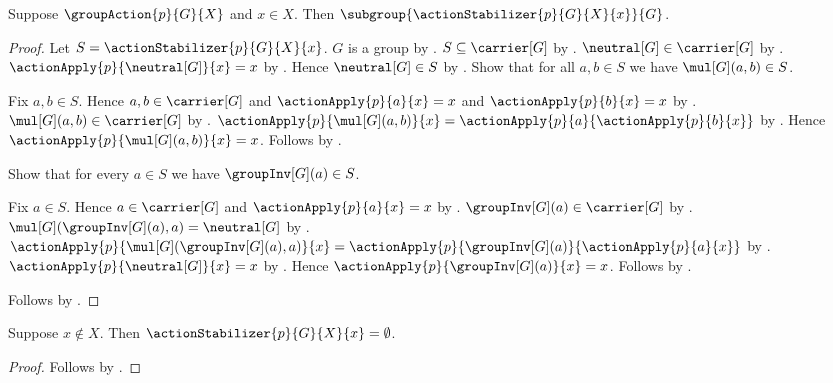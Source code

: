 \begin{theorem}\label{action_stabilizer_subgroup}
    Suppose $\groupAction{p}{G}{X}$ and $x\in X$.
    Then $\subgroup{\actionStabilizer{p}{G}{X}{x}}{G}$.
\end{theorem}
\begin{proof}
    Let $S=\actionStabilizer{p}{G}{X}{x}$.
    $G$ is a group by .
    $S\subseteq\carrier[G]$ by
        .
    $\neutral[G]\in\carrier[G]$ by
        .
    $\actionApply{p}{\neutral[G]}{x}=x$ by
        .
    Hence $\neutral[G]\in S$ by
        .
    Show that for all $a,b\in S$ we have $\mul[G](a,b)\in S$.
    \begin{subproof}
        Fix $a,b\in S$.
        Hence $a,b\in\carrier[G]$ and
            $\actionApply{p}{a}{x}=x$ and
            $\actionApply{p}{b}{x}=x$ by
            .
        $\mul[G](a,b)\in\carrier[G]$ by
            .
        $\actionApply{p}{\mul[G](a,b)}{x}=
            \actionApply{p}{a}{\actionApply{p}{b}{x}}$ by
            .
        Hence $\actionApply{p}{\mul[G](a,b)}{x}=x$.
        Follows by .
    \end{subproof}
    Show that for every $a\in S$ we have $\groupInv[G](a)\in S$.
    \begin{subproof}
        Fix $a\in S$.
        Hence $a\in\carrier[G]$ and
            $\actionApply{p}{a}{x}=x$ by
            .
        $\groupInv[G](a)\in\carrier[G]$ by
            .
        $\mul[G](\groupInv[G](a),a)=\neutral[G]$ by
            .
        $\actionApply{p}{\mul[G](\groupInv[G](a),a)}{x}=
            \actionApply{p}{\groupInv[G](a)}{
                \actionApply{p}{a}{x}}$ by
            .
        $\actionApply{p}{\neutral[G]}{x}=x$ by
            .
        Hence $\actionApply{p}{\groupInv[G](a)}{x}=x$.
        Follows by .
    \end{subproof}
    Follows by .
\end{proof}

\begin{proposition}\label{action_stabilizer_off_carrier}
    Suppose $x\notin X$.
    Then $\actionStabilizer{p}{G}{X}{x}=\emptyset$.
\end{proposition}
\begin{proof}
    Follows by .
\end{proof}
